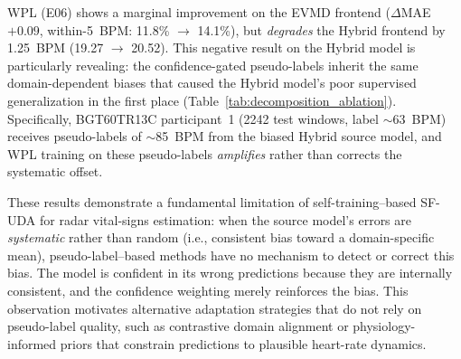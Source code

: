 WPL (E06) shows a marginal improvement on the EVMD frontend ($\Delta$MAE $+0.09$, within-5~BPM: 11.8\% $\to$ 14.1\%), but \emph{degrades} the Hybrid frontend by 1.25~BPM (19.27 $\to$ 20.52). This negative result on the Hybrid model is particularly revealing: the confidence-gated pseudo-labels inherit the same domain-dependent biases that caused the Hybrid model's poor supervised generalization in the first place (Table~\ref{tab:decomposition_ablation}). Specifically, BGT60TR13C participant~1 (2242 test windows, label $\sim$63~BPM) receives pseudo-labels of $\sim$85~BPM from the biased Hybrid source model, and WPL training on these pseudo-labels \emph{amplifies} rather than corrects the systematic offset.

These results demonstrate a fundamental limitation of self-training--based SF-UDA for radar vital-signs estimation: when the source model's errors are \emph{systematic} rather than random (i.e., consistent bias toward a domain-specific mean), pseudo-label--based methods have no mechanism to detect or correct this bias. The model is confident in its wrong predictions because they are internally consistent, and the confidence weighting merely reinforces the bias. This observation motivates alternative adaptation strategies that do not rely on pseudo-label quality, such as contrastive domain alignment or physiology-informed priors that constrain predictions to plausible heart-rate dynamics.
